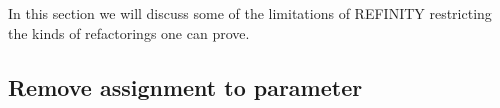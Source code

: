 In this section we will discuss some of the limitations of REFINITY restricting the kinds of refactorings one can prove.


\subsection{Remove assignment to parameter}

